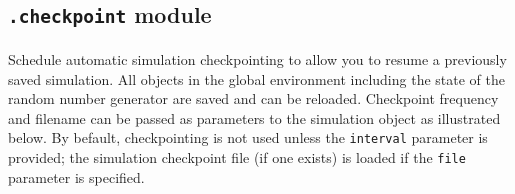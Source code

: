 \documentclass{article}
\begin{document}
\subsection{\texttt{.checkpoint} module}
\paragraph{}
Schedule automatic simulation checkpointing to allow you to resume a previously saved simulation. All objects in the global environment including the state of the random number generator are saved and can be reloaded. Checkpoint frequency and filename can be passed as parameters to the simulation object as illustrated below. By befault, checkpointing is not used unless the \texttt{interval} parameter is provided; the simulation checkpoint file (if one exists) is loaded if the \texttt{file} parameter is specified.
\end{document}
